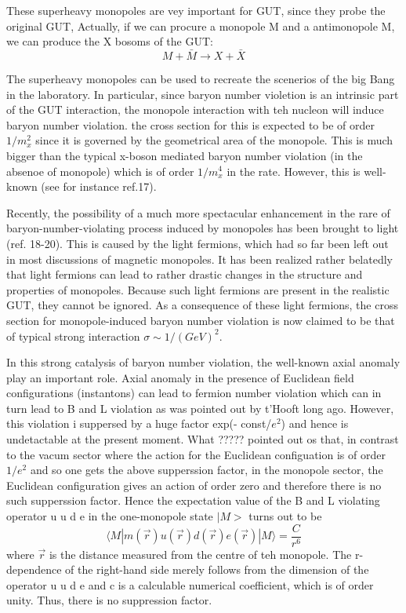 These superheavy monopoles are vey important for GUT, since they probe the original GUT, Actually, if we can procure a monopole  M and a antimonopole M, we can produce the X bosoms of the GUT:
$$
M + \bar{M} \rightarrow X + \bar{X}
$$

The superheavy monopoles can be used to recreate the scenerios of the big Bang in the laboratory. In particular, since baryon number violetion is an intrinsic part of the GUT interaction, the monopole interaction with teh nucleon will induce baryon number violation. the cross section for this is expected to be of order $1/m^{2}_{x}$ since it is governed by the geometrical area of the monopole. This is much bigger than the typical x-boson mediated baryon number violation (in the absenoe of monopole) which is of order $1/m^{4}_{x}$ in the rate. However, this is well-known (see for instance ref.17).

Recently, the possibility of a much more spectacular enhancement in the rare of baryon-number-violating process induced by monopoles has been brought to light (ref. 18-20). This is caused by the light fermions, which had so far been left out in most discussions of magnetic monopoles. It has been realized rather belatedly that light fermions can lead to rather drastic changes in the structure and properties of monopoles. Because such light fermions are present in the realistic GUT, they cannot be ignored. As a consequence of these light fermions, the cross section for monopole-induced baryon number violation is now claimed to be that of typical strong interaction $\sigma \sim 1/(GeV)^{2}$.

In this strong catalysis of baryon number violation, the well-known axial anomaly play an important role. Axial anomaly in the presence of Euclidean field configurations (instantons) can lead to fermion number violation which can in turn lead to B and L violation as was pointed out by t'Hooft long ago. However, this violation i suppersed by a huge factor exp(- const/$e^{2}$) and hence is undetactable at the present moment. What ????? pointed out os that, in contrast to the vacum sector where the action for the Euclidean configuation is of order $1/e^{2}$ and so one gets the above supperssion factor, in the monopole sector, the Euclidean configuration gives an action of order zero and therefore there is no such supperssion factor. Hence the expectation value of the B and L violating operator u u d e in the one-monopole state $|M > $ turns out to be
$$
\langle M| m(\vec{r}) u (\vec{r}) d (\vec{r}) e (\vec{r}) | M \rangle = \frac{C}{r^{6}}
$$
where $\vec{r}$ is the distance measured from the centre of teh monopole. The r-dependence of the right-hand side merely follows from the dimension of the operator  u u d e and c is a calculable  numerical coefficient, which is of order unity. Thus, there is no suppression factor.

